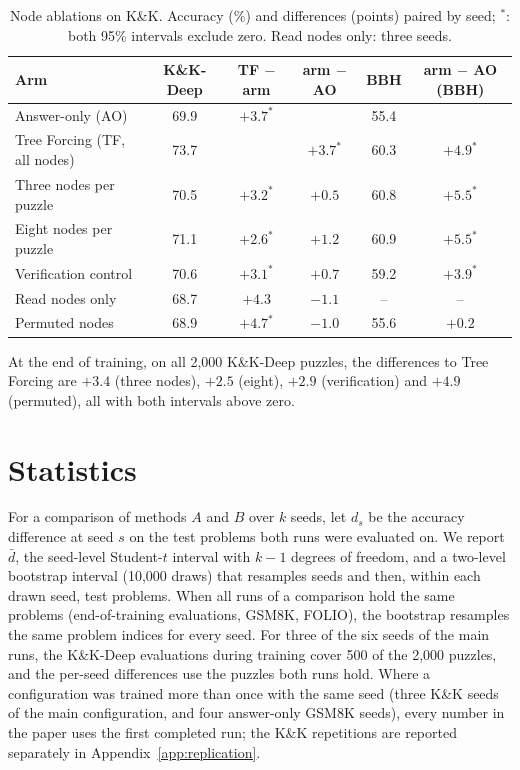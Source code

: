 \documentclass[10pt]{article}
\newcommand{\tf}{Tree Forcing}
\begin{document}
\begin{table}[h]
\centering
\small
\caption{Node ablations on K\&K. Accuracy (\%) and differences (points) paired by seed; $^\ast$: both 95\% intervals
exclude zero. Read nodes only: three seeds.}
\label{tab:ablations}
\begin{tabular}{lccccc}
\toprule
Arm & K\&K-Deep & TF $-$ arm & arm $-$ AO & BBH & arm $-$ AO (BBH) \\
\midrule
Answer-only (AO) & 69.9 & $+3.7^\ast$ & & 55.4 & \\
\tf{} (TF, all nodes) & 73.7 & & $+3.7^\ast$ & 60.3 & $+4.9^\ast$ \\
Three nodes per puzzle & 70.5 & $+3.2^\ast$ & $+0.5$ & 60.8 & $+5.5^\ast$ \\
Eight nodes per puzzle & 71.1 & $+2.6^\ast$ & $+1.2$ & 60.9 & $+5.5^\ast$ \\
Verification control & 70.6 & $+3.1^\ast$ & $+0.7$ & 59.2 & $+3.9^\ast$ \\
Read nodes only & 68.7 & $+4.3$ & $-1.1$ & -- & -- \\
Permuted nodes & 68.9 & $+4.7^\ast$ & $-1.0$ & 55.6 & $+0.2$ \\
\bottomrule
\end{tabular}
\end{table}

At the end of training, on all 2,000 K\&K-Deep puzzles, the differences to \tf{} are $+3.4$ (three nodes), $+2.5$
(eight), $+2.9$ (verification) and $+4.9$ (permuted), all with both intervals above zero.



\section{Statistics}
\label{app:stats}
For a comparison of methods $A$ and $B$ over $k$ seeds, let $d_s$ be the accuracy difference at seed $s$ on the test
problems both runs were evaluated on. We report $\bar d$, the seed-level Student-$t$ interval with $k-1$ degrees of
freedom, and a two-level bootstrap interval (10,000 draws) that resamples seeds and then, within each drawn seed,
test problems. When all runs of a comparison hold the same problems (end-of-training evaluations, GSM8K, FOLIO), the
bootstrap resamples the same problem indices for every seed. For three of the six seeds of the main runs, the K\&K-Deep evaluations during training cover 500 of the 2,000 puzzles,
and the per-seed differences use the puzzles both runs hold. Where a configuration was trained more than once with
the same seed (three K\&K seeds of the main configuration, and four answer-only GSM8K seeds), every number in the paper
uses the first completed run; the K\&K repetitions are reported separately in Appendix~\ref{app:replication}.
\end{document}
